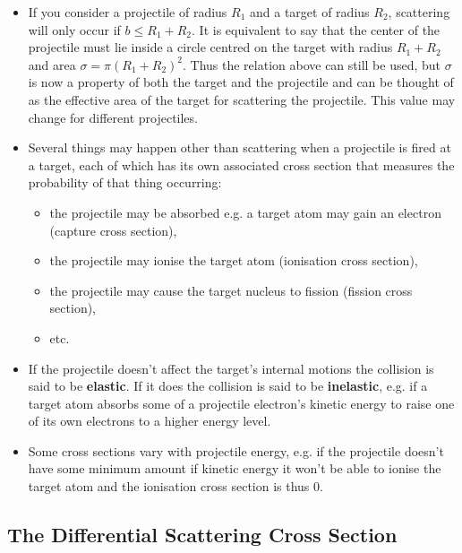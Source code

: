 \documentclass{article}
\begin{document}
\begin{itemize}
  \item If you consider a projectile of radius $R_1$ and a target of radius $R_2$, scattering will only occur if $b \le R_1 + R_2$. It is equivalent to say that the center of the projectile must lie inside a circle centred on the target with radius $R_1 + R_2$ and area $\sigma = \pi (R_1 + R_2)^2$. Thus the relation above can still be used, but $\sigma$ is now a property of both the target and the projectile and can be thought of as the effective area of the target for scattering the projectile. This value may change for different projectiles.

  \item Several things may happen other than scattering when a projectile is fired at a target, each of which has its own associated cross section that measures the probability of that thing occurring:

        \begin{itemize}
          \item the projectile may be absorbed e.g. a target atom may gain an electron (capture cross section),

          \item the projectile may ionise the target atom (ionisation cross section),

          \item the projectile may cause the target nucleus to fission (fission cross section),

          \item etc.
        \end{itemize}

  \item If the projectile doesn't affect the target's internal motions the collision is said to be \textbf{elastic}. If it does the collision is said to be \textbf{inelastic}, e.g. if a target atom absorbs some of a projectile electron's kinetic energy to raise one of its own electrons to a higher energy level.

  \item Some cross sections vary with projectile energy, e.g. if the projectile doesn't have some minimum amount if kinetic energy it won't be able to ionise the target atom and the ionisation cross section is thus 0.
\end{itemize}

\subsection{The Differential Scattering Cross Section}
\end{document}
